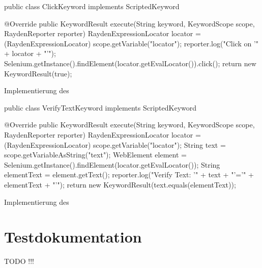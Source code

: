 \begin{program}
\begin{JavaCode}
public class ClickKeyword implements ScriptedKeyword {

  @Override
  public KeywordResult execute(String keyword, KeywordScope scope, RaydenReporter reporter) {
    RaydenExpressionLocator locator = (RaydenExpressionLocator) scope.getVariable("locator");
    reporter.log("Click on '" + locator + "'");
    Selenium.getInstance().findElement(locator.getEvalLocator()).click();
    return new KeywordResult(true);
  }
}
\end{JavaCode}
\caption{Implementierung des }
\label{prog:clickKeyword}
\end{program}



\begin{program}
\begin{JavaCode}
public class VerifyTextKeyword implements ScriptedKeyword {

  @Override
  public KeywordResult execute(String keyword, KeywordScope scope, RaydenReporter reporter) {
    RaydenExpressionLocator locator = (RaydenExpressionLocator) scope.getVariable("locator");
    String text = scope.getVariableAsString("text");
    WebElement element = Selenium.getInstance().findElement(locator.getEvalLocator());
    String elementText = element.getText();
    reporter.log("Verify Text: '" + text + "'='" + elementText + "'");
    return new KeywordResult(text.equals(elementText));
  }
}
\end{JavaCode}
\caption{Implementierung des }
\label{prog:verifyTextKeyword}
\end{program}

\todo

\clearpage

\section{Testdokumentation}

TODO !!!
